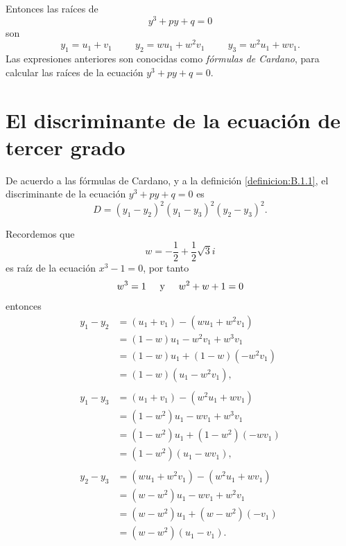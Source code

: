 Entonces las raíces de
$$y^3+py+q=0$$
son
\begin{equation}
    y_1=u_1+v_1 \hspace{1cm} y_2=wu_1+w^2v_1 \hspace{1cm} y_3=w^2u_1+wv_1. \label{APPCOSIPA3}
\end{equation}
Las expresiones anteriores son conocidas como \textit{fórmulas de Cardano}, para calcular las raíces de la ecuación $y^3+py+q=0$.

\newpage
\section{El discriminante de la ecuación de tercer grado}\label{disc_tercergrado}

De acuerdo a las fórmulas de Cardano, y a la definición \ref{definicion:B.1.1}, el discriminante de la ecuación $y^3+py+q=0$ es
$$D=(y_1-y_2)^2(y_1-y_3)^2(y_2-y_3)^2.$$

Recordemos que
$$w=-\frac{1}{2}+\frac{1}{2}\sqrt{3}i$$
es raíz de la ecuación $x^3-1=0$, por tanto
$$w^3=1 \hspace{0.5cm} \text{y} \hspace{0.5cm} w^2+w+1=0$$
entonces
\begin{align*}
    y_1-y_2 &=(u_1+v_1)-\left(wu_1+w^2v_1\right) \\
    &=(1-w)u_1-w^2v_1+w^3v_1 \\
    &=(1-w)u_1+(1-w)\left(-w^2v_1\right) \\
    &=(1-w)\left(u_1-w^2v_1\right), \\
    & \\
    y_1-y_3 &=(u_1+v_1)-\left( w^2u_1+wv_1 \right) \\
    &=\left( 1-w^2 \right) u_1-wv_1+w^3v_1 \\
    &=\left( 1-w^2 \right) u_1+\left( 1-w^2 \right) (-wv_1) \\
    &=\left( 1-w^2 \right) (u_1-wv_1), \\
    & \\
    y_2-y_3 &=\left( wu_1+w^2v_1 \right) - \left( w^2u_1+wv_1 \right) \\
    &=\left( w-w^2 \right) u_1-wv_1+w^2v_1 \\
    &=\left( w-w^2 \right) u_1+\left( w-w^2 \right) (-v_1) \\
    &=\left( w-w^2 \right) (u_1-v_1).
\end{align*}

